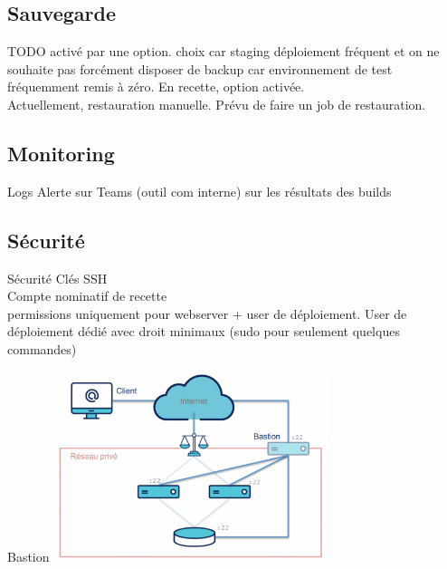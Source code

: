 \subsection{Sauvegarde}
\begin{frame}{\subsecname}
	TODO activé par une option. choix car staging déploiement fréquent et on ne souhaite pas forcément disposer de backup car environnement de test fréquemment remis à zéro. En recette, option activée. \\ 
	
	Actuellement, restauration manuelle. Prévu de faire un job de restauration.
\end{frame}

\subsection{Monitoring}
\begin{frame}{\subsecname}
	Logs
	Alerte sur Teams (outil com interne) sur les résultats des builds
\end{frame}

\subsection{Sécurité}
\begin{frame}{Sécurité}
	Clés SSH  \\
	Compte nominatif de recette \\
	permissions uniquement pour webserver + user de déploiement. 
	User de déploiement dédié avec droit minimaux (sudo pour seulement quelques commandes)
\end{frame}

\begin{frame}{Bastion}
	\centering \includegraphics[width=0.60\textwidth]{../img/bastion.png}
\end{frame}
